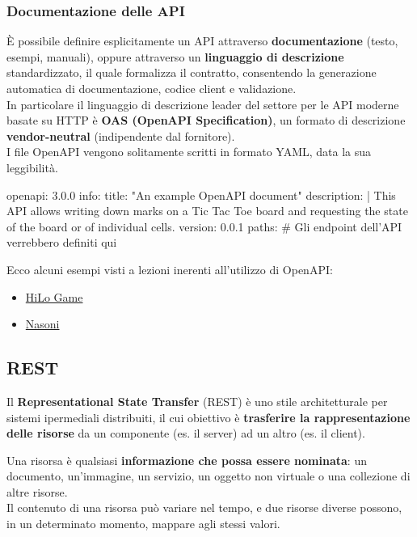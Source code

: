 \documentclass[12pt]{article}
\begin{document}
\subsubsection{Documentazione delle API}
È possibile definire esplicitamente un API attraverso \textbf{documentazione} (testo, esempi, manuali),
oppure attraverso un \textbf{linguaggio di descrizione} standardizzato, il quale formalizza il contratto, consentendo la generazione automatica di documentazione, codice client e validazione.\\
In particolare il linguaggio di descrizione leader del settore per le API moderne basate su HTTP è \textbf{OAS (OpenAPI Specification)}, un formato di descrizione \textbf{vendor-neutral} (indipendente dal fornitore).\\
I file OpenAPI vengono solitamente scritti in formato YAML, data la sua leggibilità.
\begin{code}[language=YAML]
  openapi: 3.0.0
  info:
    title: "An example OpenAPI document"
    description: |
      This API allows writing down marks on a Tic Tac Toe board
      and requesting the state of the board or of individual cells.
    version: 0.0.1
  paths: {} # Gli endpoint dell'API verrebbero definiti qui
\end{code}
Ecco alcuni esempi visti a lezioni inerenti all'utilizzo di OpenAPI:
\begin{itemize}
  \item \href{https://github.com/Viquess/Appunti-UNI/blob/main/ProgrammazioneWEB/files/hilo.yml}{HiLo Game}
  \item \href{https://github.com/Viquess/Appunti-UNI/blob/main/ProgrammazioneWEB/files/nasoni.yml}{Nasoni}
\end{itemize}

\subsection{REST}
Il \textbf{Representational State Transfer} (REST) è uno stile architetturale per sistemi ipermediali distribuiti,
il cui obiettivo è \textbf{trasferire la rappresentazione delle risorse} da un componente (es. il server) ad un altro (es. il client).
\begin{definition}[Risorsa]
Una risorsa è qualsiasi \textbf{informazione che possa essere nominata}:
un documento, un'immagine, un servizio, un oggetto non virtuale o una collezione di altre risorse.\\
Il contenuto di una risorsa può variare nel tempo, e due risorse diverse possono, in un determinato momento, mappare agli stessi valori.
\end{definition}
\end{document}
